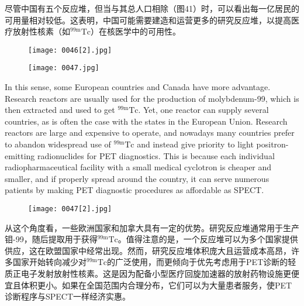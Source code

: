 \documentclass[dvipsnames, svgnames,a4paper,11pt]{article}
\begin{document}
尽管中国有五个反应堆，但当与其总人口相除（图41）时，可以看出每一亿居民的可用量相对较低。这表明，中国可能需要建造和运营更多的研究反应堆，以提高医疗放射性核素（如${}^\text{99m}\text{Tc}$）在核医学中的可用性。

\begin{figure}[ht]
      \centering
      \texttt{[image: 0046[2].jpg]}
       \label{fig41}
\end{figure}

\begin{figure}[ht]
      \centering
      \texttt{[image: 0047.jpg]}
       \label{fig42}
\end{figure}

In this sense, some European countries and Canada have more advantage. Research reactors are usually used for the production of molybdenum-99, which is then extracted and used to get \(\mathrm{^{99m}Tc}\). Yet, one reactor can supply several countries, as is often the case with the states in the European Union. Research reactors are large and expensive to operate, and nowadays many countries prefer to abandon widespread use of \(\mathrm{^{99m}Tc}\) and instead give priority to light positron-emitting radionuclides for PET diagnostics. This is because each individual radiopharmaceutical facility with a small medical cyclotron is cheaper and smaller, and if properly spread around the country, it can serve numerous patients by making PET diagnostic procedures as affordable as SPECT.  

\begin{figure}[ht]
      \centering
      \texttt{[image: 0047[2].jpg]}
       \label{fig43}
\end{figure}

从这个角度看，一些欧洲国家和加拿大具有一定的优势。研究反应堆通常用于生产钼-99，随后提取用于获得${}^\text{99m}\text{Tc}$。值得注意的是，一个反应堆可以为多个国家提供供应，这在欧盟国家中经常出现。然而，研究反应堆体积庞大且运营成本高昂，许多国家开始转向减少对${}^\text{99m}\text{Tc}$的广泛使用，而更倾向于优先考虑用于PET诊断的轻质正电子发射放射性核素。这是因为配备小型医疗回旋加速器的放射药物设施更便宜且体积更小。如果在全国范围内合理分布，它们可以为大量患者服务，使PET诊断程序与SPECT一样经济实惠。
\end{document}
